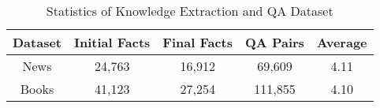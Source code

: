 \begin{table}[tbp]
    \centering
    \small
    \setlength{\tabcolsep}{3pt}
    \caption{Statistics of Knowledge Extraction and QA Dataset}
    \begin{tabular}{ccccc}
    \toprule
    Dataset & \multicolumn{1}{c}{Initial Facts} & \multicolumn{1}{c}{Final Facts} & \multicolumn{1}{c}{QA Pairs} & \multicolumn{1}{c}{Average} \\
    \midrule
    News & 24,763 & 16,912 & 69,609 & 4.11 \\
    Books & 41,123 & 27,254 & 111,855 & 4.10 \\
    \bottomrule
    \end{tabular}
    \label{tab:exp_datasetdetail}
\end{table}